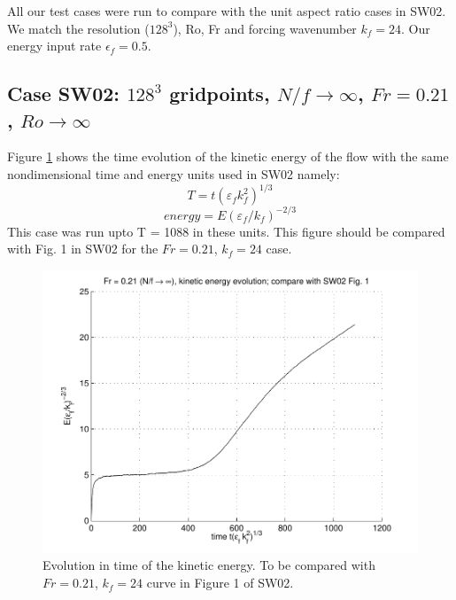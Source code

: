 \documentclass[12pt]{article}
\begin{document}
All our test cases were run to compare with the unit aspect ratio
cases in SW02. We match the resolution ($128^3$), Ro, Fr and forcing
wavenumber $k_f = 24$. Our energy input rate $\epsilon_f = 0.5$.

\subsection{Case SW02: $128^3$ gridpoints, $N/f \rightarrow \infty$, $Fr = 0.21$, $Ro \rightarrow \infty$}
Figure \ref{Froude_time} shows the time evolution of the kinetic energy of the flow with the same nondimensional time and energy units used in SW02 namely:
$$T = t(\varepsilon_f k_f^2)^{1/3}$$
$$energy = E(\varepsilon_f/k_f)^{-2/3}$$
This case was run upto T = 1088 in these units. This figure should be compared with Fig. 1 in SW02 for the $Fr = 0.21$, $k_f = 24$ case.
\begin{figure}[ht]
\centering
  \includegraphics[scale = 0.5]{Comp_SW02_fig1_Nfinf_kf24}
\caption{Evolution in time of the kinetic energy. To be compared with $Fr = 0.21$, $k_f = 24$ curve in Figure 1 of SW02.\label{Froude_time}}
\end{figure}
\end{document}
